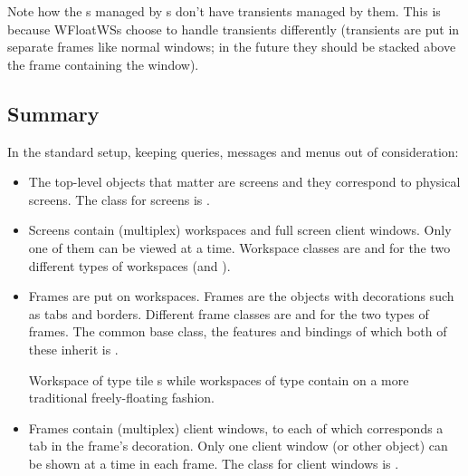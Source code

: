 Note how the s managed by s don't have
transients managed by them. This is because WFloatWSs choose to handle
transients differently (transients are put in separate frames like normal
windows; in the future they should be stacked above the frame containing the
 window).


\subsection{Summary}

In the standard setup, keeping queries, messages and menus out of
consideration:

\begin{itemize}
  \item The top-level objects that matter are screens and they correspond
    to physical screens. The class for screens is .
  \item Screens contain (multiplex) workspaces and full screen client
    windows. Only one of them can be viewed at a time.
    Workspace classes are  and  
    for the two different types of workspaces (and ).
  \item Frames are put on workspaces. Frames are the objects with 
    decorations such as tabs and borders.
    Different frame classes are  and 
    for the two types of frames. The common base class, the features and
    bindings of which both of these inherit is . 
    
    Workspace of type  tile s while
    workspaces of type  contain 
    on a more traditional freely-floating fashion.

  \item Frames contain (multiplex) client windows, to each of which
    corresponds a tab in the frame's decoration. Only one client
    window (or other object) can be shown at a time in each frame.
    The class for client windows is .
\end{itemize}

